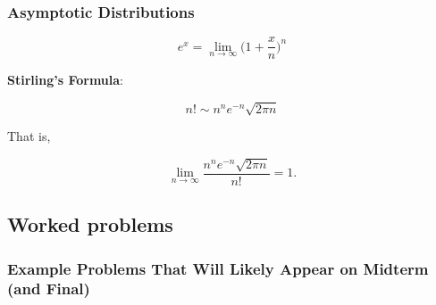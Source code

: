 \subsubsection{Asymptotic Distributions}

\begin{proposition}
\[
e^x = \lim_{n \to \infty} \bigg( 1 + \frac{x}{n}\bigg)^n
\]
\end{proposition}

\begin{theorem} \label{prob.stirling} \textbf{Stirling's Formula}: 

\[
n! \sim n^ne^{-n} \sqrt{2\pi n}
\]

That is,

\[
\lim_{n \to \infty} \frac {n^ne^{-n} \sqrt{2\pi n}}{n!} = 1.
\]
\end{theorem}

\subsection{Worked problems}

\subsubsection{Example Problems That Will Likely Appear on Midterm (and Final)}

